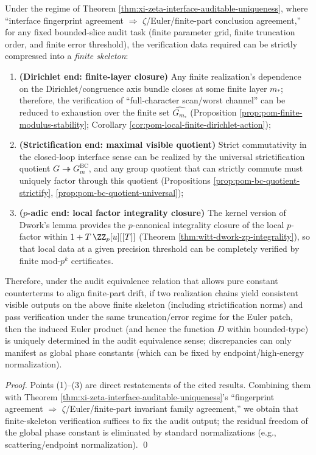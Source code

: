 \begin{corollary}\label{cor:xi-finite-skeleton-euler-uniqueness}
Under the regime of Theorem \ref{thm:xi-zeta-interface-auditable-uniqueness}, where ``interface fingerprint agreement \(\Rightarrow\) \(\zeta\)/Euler/finite-part conclusion agreement,''
for any fixed bounded-slice audit task (finite parameter grid, finite truncation order, and finite error threshold), the verification data required can be strictly compressed into a \emph{finite skeleton}:
\begin{enumerate}
  \item \textbf{(Dirichlet end: finite-layer closure)} Any finite realization's dependence on the Dirichlet/congruence axis bundle closes at some finite layer \(m_\ast\); therefore, the verification of ``full-character scan/worst channel'' can be reduced to exhaustion over the finite set \(\widehat{G_{m_\ast}}\) (Proposition \ref{prop:pom-finite-modulus-stability}; Corollary \ref{cor:pom-local-finite-dirichlet-action});
  \item \textbf{(Strictification end: maximal visible quotient)} Strict commutativity in the closed-loop interface sense can be realized by the universal strictification quotient \(G\twoheadrightarrow G^{\mathrm{BC}}_{m}\), and any group quotient that can strictly commute must uniquely factor through this quotient (Propositions \ref{prop:pom-bc-quotient-strictify}, \ref{prop:pom-bc-quotient-universal});
  \item \textbf{(\(p\)-adic end: local factor integrality closure)} The kernel version of Dwork's lemma provides the \(p\)-canonical integrality closure of the local \(p\)-factor within \(1+T\,\ZZ_p[u][[T]]\) (Theorem \ref{thm:witt-dwork-zp-integrality}), so that local data at a given precision threshold can be completely verified by finite mod-\(p^k\) certificates.
\end{enumerate}
Therefore, under the audit equivalence relation that allows pure constant counterterms to align finite-part drift,
if two realization chains yield consistent visible outputs on the above finite skeleton (including strictification norms) and pass verification under the same truncation/error regime for the Euler patch,
then the induced Euler product (and hence the function \(D\) within bounded-type) is uniquely determined in the audit equivalence sense; discrepancies can only manifest as global phase constants (which can be fixed by endpoint/high-energy normalization).
\end{corollary}
\begin{proof}
Points (1)--(3) are direct restatements of the cited results.
Combining them with Theorem \ref{thm:xi-zeta-interface-auditable-uniqueness}'s ``fingerprint agreement \(\Rightarrow\) \(\zeta\)/Euler/finite-part invariant family agreement,'' we obtain that finite-skeleton verification suffices to fix the audit output; the residual freedom of the global phase constant is eliminated by standard normalizations (e.g., scattering/endpoint normalization). \qed
\end{proof}

